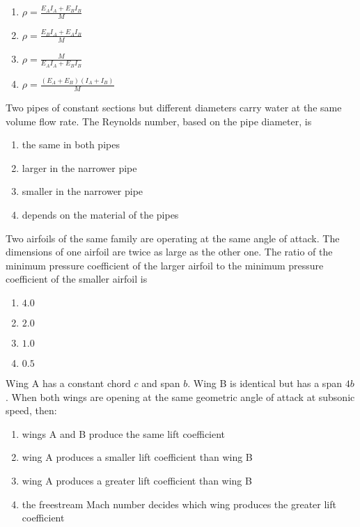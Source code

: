 		\begin{enumerate}
    			\item $ \rho = \frac{E_A I_A + E_B I_B}{M} $
   			\item $ \rho = \frac{E_B I_A + E_A I_B}{M} $
  			\item $ \rho = \frac{M}{E_A I_A + E_B I_B} $
  			\item $ \rho = \frac{(E_A + E_B)(I_A + I_B)}{M} $
		\end{enumerate}


	\item Two pipes of constant sections but different diameters carry water at the same volume flow rate. The Reynolds number, based on the pipe diameter, is
		\begin{enumerate}
    			\item the same in both pipes
    			\item larger in the narrower pipe
    			\item smaller in the narrower pipe
    			\item depends on the material of the pipes
		\end{enumerate}

	\item 	Two airfoils of the same family are operating at the same angle of attack. The dimensions of one airfoil are twice as large as the other one. The ratio of the minimum pressure coefficient of the larger airfoil to the minimum pressure coefficient of the smaller airfoil is
		\begin{enumerate}
			\item $4.0$
    			\item $2.0$
    			\item $1.0$
    			\item $0.5$
		\end{enumerate}


	\item Wing A has a constant chord $c$ and span $b$. Wing B is identical but has a span $4b$. When both wings are opening at the same geometric angle of attack at subsonic speed, then:
		\begin{enumerate}
			\item wings A and B produce the same lift coefficient
			\item wing A produces a smaller lift coefficient than wing B
			\item wing A produces a greater lift coefficient than wing B
			\item the freestream Mach number decides which wing produces the greater lift coefficient
		\end{enumerate}


